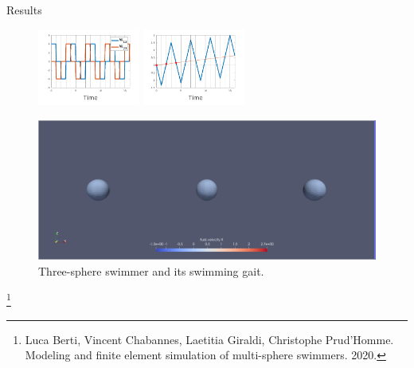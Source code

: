 \documentclass{beamer}
\begin{document}
\begin{frame}{Results}
\begin{figure}
{
		}
		\includegraphics[width=0.3\textwidth]{figures/W_cl.png}
		\includegraphics[width=0.3\textwidth]{figures/CM_evolution_1.png}
		\caption{Three-sphere swimmer and its swimming gait.}
		
		\label{Fig:results}
		\begin{center}
			\includegraphics[width=0.5\linewidth]{figures/Threespheres.png}
		\end{center}
	\end{figure}
\footnote{\tiny Luca Berti, Vincent Chabannes, Laetitia Giraldi, Christophe Prud'Homme. Modeling and finite element simulation of multi-sphere swimmers. 2020.}

	\end{frame}
%			
%			
\end{document}
